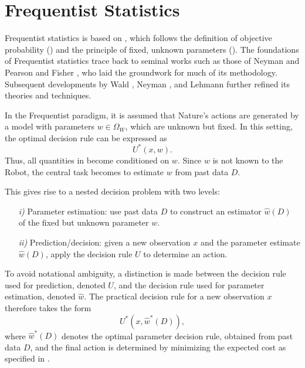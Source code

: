 \section{Frequentist Statistics}
\label{chp:freq}
Frequentist statistics is based on , which follows the definition of objective probability () and the principle of fixed, unknown parameters (). The foundations of Frequentist statistics trace back to seminal works such as those of Neyman and Pearson \citep{Neyman1928OnSR} and Fisher \citep{fisher1925statistical}, who laid the groundwork for much of its methodology. Subsequent developments by Wald \citep{Wald1945Sequential}, Neyman \citep{Neyman1948Consistent}, and Lehmann \citep{lehmann1986testing} further refined its theories and techniques.\newline

In the Frequentist paradigm, it is assumed that Nature's actions are generated by a model with parameters $w \in \Omega_W$, which are unknown but fixed. In this setting, the optimal decision rule can be expressed as
\begin{equation}
	U^*(x,w).
\end{equation}
Thus, all quantities in  become conditioned on $w$. Since $w$ is not known to the Robot, the central task becomes to estimate $w$ from past data $D$. 

This gives rise to a nested decision problem with two levels:
\begin{enumerate}
	\item[\textit{i)}] Parameter estimation: use past data $D$ to construct an estimator $\hat{w}(D)$ of the fixed but unknown parameter $w$.
	\item[\textit{ii)}] Prediction/decision: given a new observation $x$ and the parameter estimate $\hat{w}(D)$, apply the decision rule $U$ to determine an action.
\end{enumerate}

To avoid notational ambiguity, a distinction is made between the decision rule used for prediction, denoted $U$, and the decision rule used for parameter estimation, denoted $\hat{w}$. The practical decision rule for a new observation $x$ therefore takes the form
\begin{equation}
	U^*(x, \hat{w}^*(D)),
\end{equation}
where $\hat{w}^*(D)$ denotes the optimal parameter decision rule, obtained from past data $D$, and the final action is determined by minimizing the expected cost as specified in .





